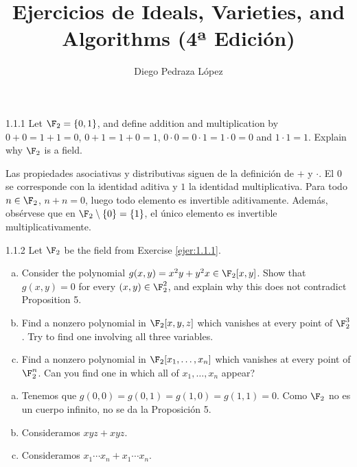 \documentclass[twoside]{article}
\begin{document}
\title{Ejercicios de Ideals, Varieties, and Algorithms (4ª Edición)}
\author{Diego Pedraza López}
\maketitle

\begin{ejercicio}{1.1.1}
Let $\F_2 = \{0,1\}$, and define addition and multiplication by $0+0=1+1=0$, $0+1=1+0=1$, $0\cdot 0=0\cdot 1 = 1 \cdot 0 = 0$ and $1 \cdot 1 = 1$.
Explain why $\F_2$ is a field.
\end{ejercicio}
\begin{solucion}
Las propiedades asociativas y distributivas siguen de la definición de $+$ y $\cdot$.
El $0$ se corresponde con la identidad aditiva y $1$ la identidad multiplicativa.
Para todo $n \in \F_2$, $n+n=0$, luego todo elemento es invertible aditivamente.
Además, obsérvese que en $\F_2 \setminus \{0\} = \{1\}$, el único elemento es invertible multiplicativamente.
\end{solucion}

\newpage

\begin{ejercicio}{1.1.2}
Let $\F_2$ be the field from Exercise \ref{ejer:1.1.1}.
\begin{enumerate}[a.]
\item Consider the polynomial $g(x,y)=x^2y+y^2x \in \F_2[x,y]$.
Show that $g(x,y)=0$ for every $(x,y) \in \F_2^2$, and explain why this does not contradict Proposition 5.
\item Find a nonzero polynomial in $\F_2[x,y,z]$ which vanishes at every point of $\F_2^3$.
Try to find one involving all three variables.
\item Find a nonzero polynomial in $\F_2[x_1,\dots,x_n]$ which vanishes at every point of $\F_2^n$.
Can you find one in which all of $x_1,\dots,x_n$ appear?
\end{enumerate}
\end{ejercicio}
\begin{solucion}
\begin{enumerate}[a.]
\item Tenemos que $g(0,0)=g(0,1)=g(1,0)=g(1,1)=0$.
Como $\F_2$ no es un cuerpo infinito, no se da la Proposición 5.
\item Consideramos $xyz+xyz$.
\item Consideramos $x_1\cdots x_n + x_1\cdots x_n$.
\end{enumerate}
\end{solucion}
\end{document}

